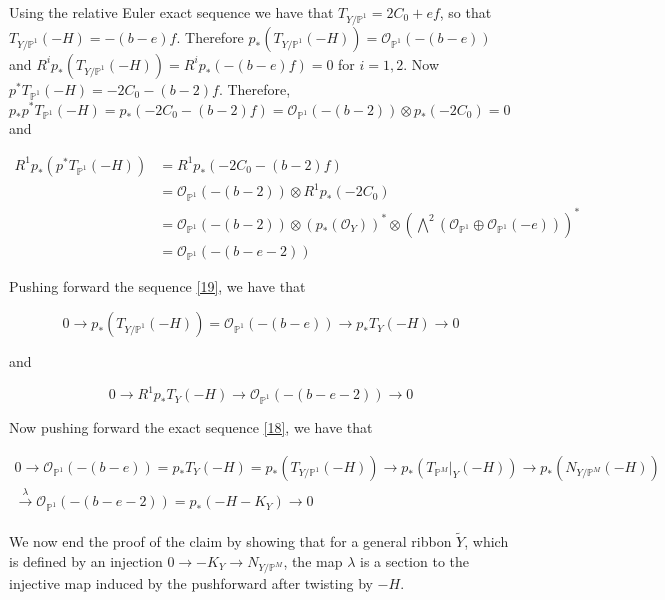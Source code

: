 \documentclass[11pt,twoside]{amsart}
\theoremstyle{plain}
\numberwithin{equation}{section}
\theoremstyle{definition}
\begin{document}
Using the relative Euler exact sequence we have that 
$T_{Y/\mathbb{P}^1} = 2C_0+ef$, so that $T_{Y/\mathbb{P}^1}(-H) = -(b-e)f$. Therefore $p_*(T_{Y/\mathbb{P}^1}(-H)) = \mathcal{O}_{\mathbb{P}^1}(-(b-e))$ and $R^ip_*(T_{Y/\mathbb{P}^1}(-H)) = R^ip_*(-(b-e)f) = 0$ for $i = 1,2$. Now $p^*T_{\mathbb{P}^1}(-H) = -2C_0-(b-2)f$. Therefore, $p_*p^*T_{\mathbb{P}^1}(-H) = p_*(-2C_0-(b-2)f) = \mathcal{O}_{\mathbb{P}^1}(-(b-2)) \otimes p_*(-2C_0) = 0$ and

\begin{align*}\label{20}
  R^1p_*(p^*T_{\mathbb{P}^1}(-H)) & = R^1p_*(-2C_0-(b-2)f) \\
  & = \mathcal{O}_{\mathbb{P}^1}(-(b-2)) \otimes R^1p_*(-2C_0) \\
  & = \mathcal{O}_{\mathbb{P}^1}(-(b-2)) \otimes (p_*(\mathcal{O}_Y))^* \otimes (\bigwedge^2(\mathcal{O}_{\mathbb{P}^1} \oplus \mathcal{O}_{\mathbb{P}^1}(-e)))^* \\ 
  & = \mathcal{O}_{\mathbb{P}^1}(-(b-e-2))
\end{align*}

Pushing forward the sequence \ref{19}, we have that 

\begin{equation}\label{21}
0 \to p_*(T_{Y/\mathbb{P}^1}(-H)) = \mathcal{O}_{\mathbb{P}^1}(-(b-e)) \to p_*T_Y(-H) \to 0    
\end{equation}

and 

\begin{equation}\label{22}
   0 \to R^1p_*T_Y(-H) \to \mathcal{O}_{\mathbb{P}^1}(-(b-e-2)) \to 0 
\end{equation}

Now pushing forward the exact sequence \ref{18}, we have that 

\begin{multline}\label{23}
0 \to \mathcal{O}_{\mathbb{P}^1}(-(b-e)) = p_*T_Y(-H) = p_*(T_{Y/\mathbb{P}^1}(-H)) \to p_*(T_{\mathbb{P}^M}|_Y(-H)) \to p_*(N_{Y/\mathbb{P}^M}(-H)) \\ \xrightarrow[]{\lambda} \mathcal{O}_{\mathbb{P}^1}(-(b-e-2)) = p_*(-H-K_Y) \to 0
\end{multline}

We now end the proof of the claim by showing that for a general ribbon $\widetilde{Y}$, which is defined by an injection $0 \to -K_Y \to N_{Y/\mathbb{P}^M}$, the map $\lambda$ is a section to the injective map induced by the pushforward after twisting by $-H$. 
\end{document}
